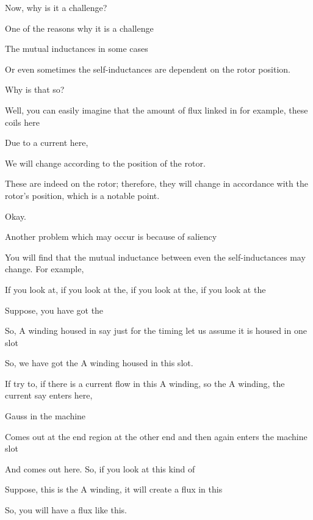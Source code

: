 \documentclass{article}
\begin{document}
Now, why is it a challenge?

One of the reasons why it is a challenge

The mutual inductances in some cases

Or even sometimes the self-inductances are dependent on the rotor position.

Why is that so?

Well, you can easily imagine that the amount of flux linked in for example, these coils here

Due to a current here,

We will change according to the position of the rotor.

These are indeed on the rotor; therefore, they will change in accordance with the rotor's position, which is a notable point.

Okay.



Another problem which may occur is because of saliency

You will find that the mutual inductance between even the self-inductances may change. For example,

If you look at, if you look at the, if you look at the, if you look at the

Suppose, you have got the

So, A winding housed in say just for the timing let us assume it is housed in one slot

So, we have got the A winding housed in this slot.

If try to, if there is a current flow in this A winding, so the A winding, the current say enters here,

Gauss in the machine

Comes out at the end region at the other end and then again enters the machine slot

And comes out here. So, if you look at this kind of

Suppose, this is the A winding, it will create a flux in this

So, you will have a flux like this.
\end{document}

